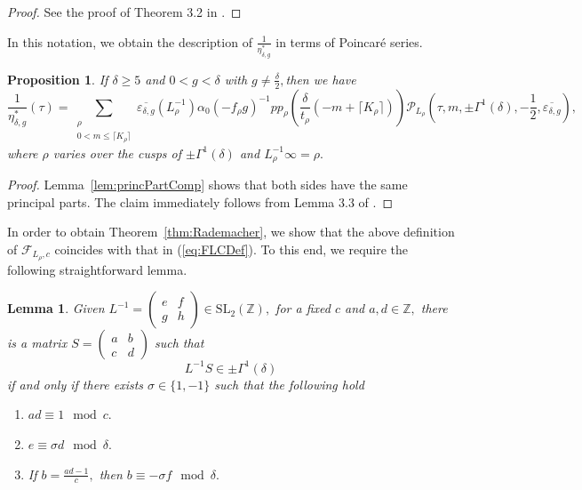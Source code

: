 \documentclass[10pt]{amsart}
\newtheorem{lemma}[theorem]{Lemma}
\newtheorem{proposition}[theorem]{Proposition}
\theoremstyle{definition}
\theoremstyle{remark}
\numberwithin{equation}{section}
\newcommand{\SL}{\mathrm{SL}}
\newcommand{\Z}{\mathbb Z}
\begin{document}
	\begin{proof}
		See the proof of Theorem 3.2 in \cite{BringmannOno}.
	\end{proof}
	
	In this notation, we obtain the description of $\frac{1}{\eta_{\delta,g}^\ast}$ in terms of Poincar\'e series.
	
	\begin{proposition}\label{prop:EtaPoincare}
		If $\delta\geq 5$ and $0<g<\delta$ with $g\neq\frac{\delta}{2},$then we have
		$$
		\frac{1}{\eta_{\delta,g}^\ast}(\tau)=\sum\limits_{\substack{\rho \\ 0< m \leq \lceil K_\rho\rceil }}\overline{\varepsilon_{\delta,g}}(L_\rho^{-1})\alpha_0(-f_\rho g)^{-1}pp_\rho\left(\frac{\delta}{t_\rho}(-m+\lceil K_\rho\rceil)\right)\mathcal{P}_{L_\rho}\left(\tau,m,\pm\Gamma^1(\delta),-\frac{1}{2},\overline{\varepsilon_{\delta,g}}\right),
		$$
		where $\rho$ varies over the cusps of $\pm\Gamma^1(\delta)$ and $L_\rho^{-1}\infty=\rho.$ 
	\end{proposition}
	
	\begin{proof}
		Lemma~\ref{lem:princPartComp} shows that both sides have the same principal parts. The claim immediately follows from Lemma 3.3 of \cite{Gomez}.
	\end{proof}
	
	In order to obtain Theorem~\ref{thm:Rademacher}, we show that the above definition of  $\mathcal{F}_{L_\rho,c}$ coincides with that in (\ref{eq:FLCDef}). To this end, we require the following straightforward lemma.
	
		\begin{lemma}
		Given $L^{-1}=\begin{pmatrix}
			e & f \\
			g & h
		\end{pmatrix}\in\SL_2(\Z),$ for a fixed $c$ and $a,d\in\Z,$ there is a matrix $S=\begin{pmatrix}
			a & b \\
			c & d
		\end{pmatrix}$ such that 
		$$
		L^{-1}S\in\pm\Gamma^1(\delta)
		$$
		if and only if there exists $\sigma\in\{1,-1\}$ such that the following hold
		\begin{enumerate}
			\item $ad\equiv 1\mod c.$
			\item $e\equiv \sigma d\mod\delta.$
			\item If $b=\frac{ad-1}{c},$ then $b\equiv -\sigma f\mod\delta.$ 
		\end{enumerate}
	\end{lemma}
	
\end{document}
